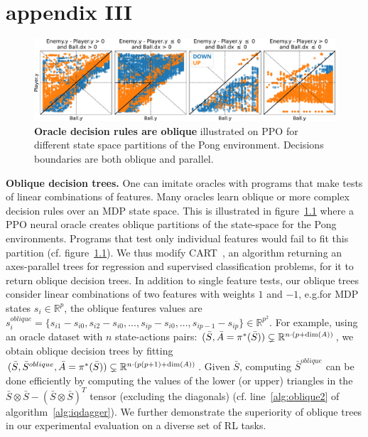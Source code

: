 \chapter{appendix III}
\label{chap-app-imit}
\begin{figure}[b]
    \centering
    \includegraphics[width=1.\textwidth]{images/images_part3/pong_state_space.pdf}
    \caption{\textbf{Oracle decision rules are oblique} illustrated on PPO for different state space partitions of the Pong environment. Decisions boundaries are both oblique and parallel.}
    \label{fig:pong_states}
\end{figure}

\textbf{Oblique decision trees.} One can imitate oracles with programs that make tests of linear combinations of features. Many oracles learn oblique or more complex decision rules over an MDP state space. This is illustrated in figure~\ref{fig:pong_states} where a PPO neural oracle creates oblique partitions of the state-space for the Pong environments. Programs that test only individual features would fail to fit this partition (cf. figure~\ref{fig:pong_states}). 
We thus modify CART~\cite{breiman1984classification}, an algorithm returning an axes-parallel trees for regression and supervised classification problems, for it to return oblique decision trees. 
In addition to single feature tests, our oblique trees consider linear combinations of two features with weights $1$ and $-1$, e.g.\@ for MDP states $s_i \in \mathbb{R}^{p}$, the oblique features values are $s^{oblique}_i = \{s_{i1} - s_{i0}, s_{i2} - s_{i0}, ..., s_{ip} - s_{i0}, ...,s_{ip-1} - s_{ip}\} \in \mathbb{R}^{p^2}$. For example, using an oracle dataset with $n$ state-actions pairs: $(\bar{S}, \Bar{A} = \pi^{*}(\bar{S})) \subsetneq \mathbb{R}^{n\cdot(p+\dim(A))}$, we obtain oblique decision trees by fitting $(\bar{S},\bar{S}^{oblique} , \Bar{A} = \pi^{*}(\bar{S})) \subsetneq \mathbb{R}^{n\cdot(p(p+1)+\dim(A))}$. 
Given $\bar{S}$, computing $\bar{S}^{oblique}$ can be done efficiently by computing the values of the lower (or upper) triangles in the $\bar{S} \otimes \bar{S} - (\bar{S} \otimes \bar{S})^T$ tensor (excluding the diagonals) (cf. line~\ref{alg:oblique2} of algorithm~\ref{alg:iqdagger}). We further demonstrate the superiority of oblique trees in our experimental evaluation on a diverse set of RL tasks.


